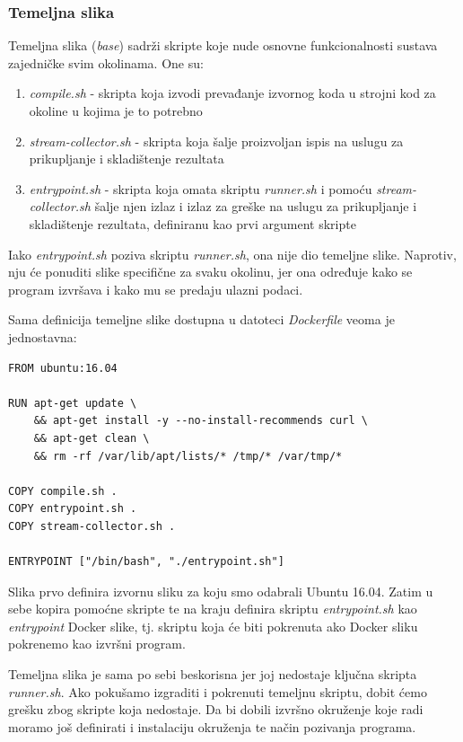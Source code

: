 \documentclass[times, utf8, zavrsni]{fer}
\begin{document}
\subsubsection{Temeljna slika}

Temeljna slika ({\textit{base}}) sadrži skripte koje nude osnovne funkcionalnosti sustava zajedničke svim okolinama. One su:

\begin{enumerate}
\item {\textit{compile.sh}} - skripta koja izvodi prevađanje izvornog koda u strojni kod za okoline u kojima je to potrebno
\item {\textit{stream-collector.sh}} - skripta koja šalje proizvoljan ispis na uslugu za prikupljanje i skladištenje rezultata
\item {\textit{entrypoint.sh}} - skripta koja omata skriptu {\textit{runner.sh}} i pomoću {\textit{stream-collector.sh}} šalje njen izlaz i izlaz za greške na uslugu za prikupljanje i skladištenje rezultata, definiranu kao prvi argument skripte
\end{enumerate}

Iako {\textit{entrypoint.sh}} poziva skriptu {\textit{runner.sh}}, ona nije dio temeljne slike. Naprotiv, nju će ponuditi slike specifične za svaku okolinu, jer ona određuje kako se program izvršava i kako mu se predaju ulazni podaci.

Sama definicija temeljne slike dostupna u datoteci {\textit{Dockerfile}} veoma je jednostavna:

\begin{lstlisting}
FROM ubuntu:16.04

RUN apt-get update \
    && apt-get install -y --no-install-recommends curl \
    && apt-get clean \
    && rm -rf /var/lib/apt/lists/* /tmp/* /var/tmp/*

COPY compile.sh .
COPY entrypoint.sh .
COPY stream-collector.sh .

ENTRYPOINT ["/bin/bash", "./entrypoint.sh"]
\end{lstlisting}

Slika prvo definira izvornu sliku za koju smo odabrali Ubuntu 16.04. Zatim u sebe kopira pomoćne skripte te na kraju definira skriptu {\textit{entrypoint.sh}} kao {\textit{entrypoint}} Docker slike, tj. skriptu koja će biti pokrenuta ako Docker sliku pokrenemo kao izvršni program.

Temeljna slika je sama po sebi beskorisna jer joj nedostaje ključna skripta {\textit{runner.sh}}. Ako pokušamo izgraditi i pokrenuti temeljnu skriptu, dobit ćemo grešku zbog skripte koja nedostaje. Da bi dobili izvršno okruženje koje radi moramo još definirati i instalaciju okruženja te način pozivanja programa.
\end{document}

